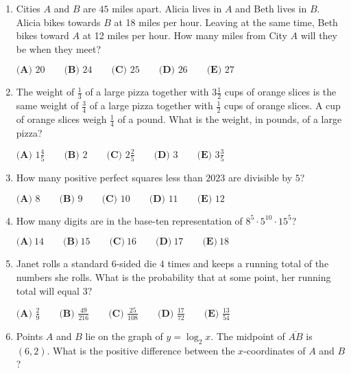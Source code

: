 \documentclass{article}
\begin{document}
\begin{enumerate}[label=\arabic*., itemsep=0.5em]\item Cities \(A\) and \(B\) are \(45\) miles apart. Alicia lives in \(A\) and Beth lives in \(B\). Alicia bikes towards \(B\) at 18 miles per hour. Leaving at the same time, Beth bikes toward \(A\) at 12 miles per hour. How many miles from City \(A\) will they be when they meet?

\(\textbf{(A) }20\qquad\textbf{(B) }24\qquad\textbf{(C) }25\qquad\textbf{(D) }26\qquad\textbf{(E) }27\)\par \vspace{0.5em}\item The weight of \(\frac{1}{3}\) of a large pizza together with \(3 \frac{1}{2}\) cups of orange slices is the same weight of \(\frac{3}{4}\) of a large pizza together with \(\frac{1}{2}\) cups of orange slices. A cup of orange slices weigh \(\frac{1}{4}\) of a pound. What is the weight, in pounds, of a large pizza?

\(\textbf{(A) }1\frac{4}{5}\qquad\textbf{(B) }2\qquad\textbf{(C) }2\frac{2}{5}\qquad\textbf{(D) }3\qquad\textbf{(E) }3\frac{3}{5}\)\par \vspace{0.5em}\item How many positive perfect squares less than \(2023\) are divisible by \(5\)?

\(\textbf{(A) }8\qquad\textbf{(B) }9\qquad\textbf{(C) }10\qquad\textbf{(D) }11\qquad\textbf{(E) }12\)\par \vspace{0.5em}\item How many digits are in the base-ten representation of \(8^5 \cdot 5^{10} \cdot 15^5\)?

\(\textbf{(A)}~14\qquad\textbf{(B)}~15\qquad\textbf{(C)}~16\qquad\textbf{(D)}~17\qquad\textbf{(E)}~18\qquad\)\par \vspace{0.5em}\item Janet rolls a standard \(6\)-sided die \(4\) times and keeps a running total of the numbers she rolls. What is the probability that at some point, her running total will equal \(3?\)

\(\textbf{(A) }\frac{2}{9}\qquad\textbf{(B) }\frac{49}{216}\qquad\textbf{(C) }\frac{25}{108}\qquad\textbf{(D) }\frac{17}{72}\qquad\textbf{(E) }\frac{13}{54}\)\par \vspace{0.5em}\item Points \(A\) and \(B\) lie on the graph of \(y=\log_{2}x\). The midpoint of \(\overline{AB}\) is \((6, 2)\). What is the positive difference between the \(x\)-coordinates of \(A\) and \(B\)?


\end{enumerate}
\end{document}
